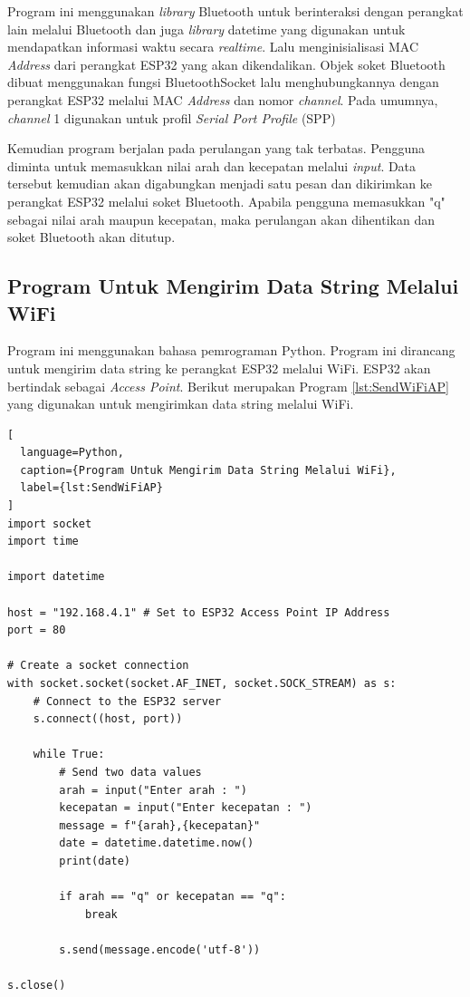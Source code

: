 Program ini menggunakan \emph{library} Bluetooth untuk berinteraksi dengan perangkat lain melalui Bluetooth dan juga \emph{library} datetime yang digunakan untuk mendapatkan informasi waktu secara \emph{realtime}. Lalu menginisialisasi MAC \emph{Address} dari perangkat ESP32 yang akan dikendalikan. Objek soket Bluetooth dibuat menggunakan fungsi BluetoothSocket lalu menghubungkannya dengan perangkat ESP32 melalui MAC \emph{Address} dan nomor \emph{channel}. Pada umumnya, \emph{channel} 1 digunakan untuk profil \emph{Serial Port Profile} (SPP)

Kemudian program berjalan pada perulangan yang tak terbatas. Pengguna diminta untuk memasukkan nilai arah dan kecepatan melalui \emph{input}. Data tersebut kemudian akan digabungkan menjadi satu pesan dan dikirimkan ke perangkat ESP32 melalui soket Bluetooth. Apabila pengguna memasukkan "q" sebagai nilai arah maupun kecepatan, maka perulangan akan dihentikan dan soket Bluetooth akan ditutup.

\subsection{Program Untuk Mengirim Data String Melalui WiFi}

Program ini menggunakan bahasa pemrograman Python. Program ini dirancang untuk mengirim data string ke perangkat ESP32 melalui WiFi. ESP32 akan bertindak sebagai \emph{Access Point}. Berikut merupakan Program \ref{lst:SendWiFiAP} yang digunakan untuk mengirimkan data string melalui WiFi.

\begin{lstlisting}[
  language=Python,
  caption={Program Untuk Mengirim Data String Melalui WiFi},
  label={lst:SendWiFiAP}
]
import socket
import time

import datetime

host = "192.168.4.1" # Set to ESP32 Access Point IP Address
port = 80

# Create a socket connection
with socket.socket(socket.AF_INET, socket.SOCK_STREAM) as s:
    # Connect to the ESP32 server
    s.connect((host, port))
    
    while True:
        # Send two data values
        arah = input("Enter arah : ")
        kecepatan = input("Enter kecepatan : ")
        message = f"{arah},{kecepatan}"
        date = datetime.datetime.now()
        print(date)
    
        if arah == "q" or kecepatan == "q":
            break
    
        s.send(message.encode('utf-8'))
        
s.close()

\end{lstlisting}

